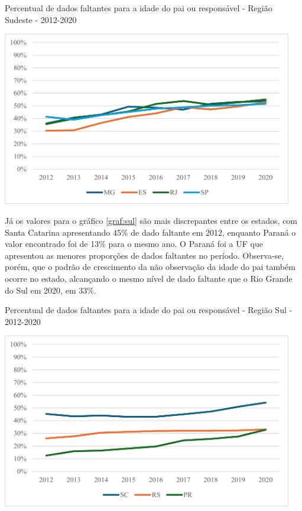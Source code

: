 \begin{grafico}
    \centering  
    \caption{Percentual de dados faltantes para a idade do pai ou responsável - Região Sudeste - 2012-2020}
    \includegraphics[width=5.0in]{imagens/faltantes-sudeste.pdf}
    \label{graf:sudeste}
\end{grafico}

Já os valores para o gráfico \ref{graf:sul} são mais discrepantes entre os estados, com Santa Catarina apresentando 45\% de dado faltante em 2012, enquanto Paraná o valor encontrado foi de 13\% para o mesmo ano. O Paraná foi a UF que apresentou as menores proporções de dados faltantes no período. Observa-se, porém, que o padrão de crescimento da não observação da idade do pai também ocorre no estado, alcançando o mesmo nível de dado faltante que o Rio Grande do Sul em 2020, em 33\%.

\begin{grafico}
    \centering  
    \caption{Percentual de dados faltantes para a idade do pai ou responsável - Região Sul - 2012-2020}
        \includegraphics[width=5.0in]{imagens/faltantes-sul.pdf}
    \label{graf:sul}
\end{grafico}


